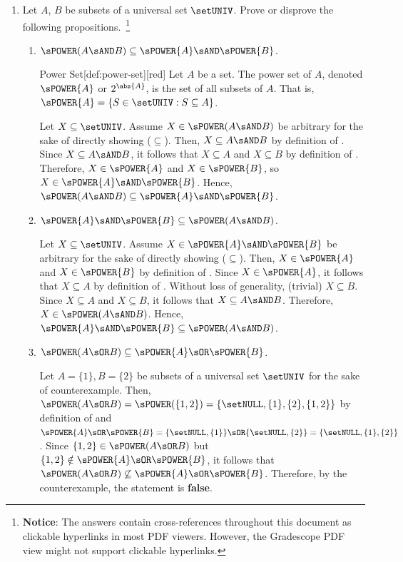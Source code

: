 \begin{enumerate}
  \newpage
  \item Let $A$, $B$ be subsets of a universal set $\setUNIV$. 
  Prove or disprove the following propositions.~\footnote{
    \textbf{Notice}: The answers contain cross-references throughout this document as clickable hyperlinks in most PDF viewers. 
    However, the Gradescope PDF view might not support clickable hyperlinks.
  }
  \begin{enumerate}
    \item $\sPOWER(A \sAND B) \subseteq \sPOWER{A} \sAND \sPOWER{B}$.
    \begin{define}{Power Set}[def:power-set][red]
      Let $A$ be a set. The power set of $A$, denoted $\sPOWER{A}$ or $2^{\abs{A}}$, is the set of all subsets of $A$. That is, $\sPOWER{A} = \{S\in\setUNIV : S \subseteq A\}$.
    \end{define}
    \begin{subprove}
      Let $X \subseteq\setUNIV$. Assume $X\in\sPOWER(A \sAND B)$ be arbitrary for the sake of directly showing ($\subseteq$). 
      Then, $X \subseteq A \sAND B$ by definition of . 
      Since $X \subseteq A \sAND B$, it follows that 
      $X \subseteq A$ and $X \subseteq B$ by definition of . Therefore, $X \in \sPOWER{A}$ 
      and $X \in \sPOWER{B}$, so $X \in \sPOWER{A} \sAND \sPOWER{B}$.
      Hence, $\sPOWER(A \sAND B) \subseteq \sPOWER{A} \sAND \sPOWER{B}$.
    \end{subprove}
    
    \item $\sPOWER{A} \sAND \sPOWER{B} \subseteq \sPOWER(A \sAND B)$.
    \begin{subprove}
      Let $X \subseteq\setUNIV$. Assume $X\in\sPOWER{A} \sAND \sPOWER{B}$ be arbitrary for the sake of directly showing ($\subseteq$). 
      Then, $X \in \sPOWER{A}$ and $X \in \sPOWER{B}$ by definition of . 
      Since $X \in \sPOWER{A}$, it follows that $X \subseteq A$ by definition of . 
      Without loss of generality, (trivial) $X \subseteq B$.
      Since $X \subseteq A$ and $X \subseteq B$, it follows that $X \subseteq A \sAND B$.
      Therefore, $X \in \sPOWER(A \sAND B)$.
      Hence, $\sPOWER{A} \sAND \sPOWER{B} \subseteq \sPOWER(A \sAND B)$.
    \end{subprove}

    \item $\sPOWER(A \sOR B) \subseteq \sPOWER{A} \sOR \sPOWER{B}$.
    \begin{subdisprove}
      Let $A=\{1\}, B=\{2\}$ be subsets of a universal set $\setUNIV$ 
      for the sake of counterexample. 
      Then, $\sPOWER(A \sOR B)=\sPOWER(\{1,2\})=\{\setNULL,\{1\},\{2\},\{1,2\}\}$ by definition of 
      and $\sPOWER{A} \sOR \sPOWER{B}=\{\setNULL,\{1\}\} \sOR \{\setNULL,\{2\}\}=\{\setNULL,\{1\},\{2\}\}$. 
      Since $\{1,2\} \in \sPOWER(A \sOR B)$ but $\{1,2\} \notin \sPOWER{A} \sOR \sPOWER{B}$, 
      it follows that $\sPOWER(A \sOR B) \not\subseteq \sPOWER{A} \sOR \sPOWER{B}$. 
      Therefore, by the counterexample, the statement is \textbf{false}.
    \end{subdisprove}


\end{enumerate}
\end{enumerate}
